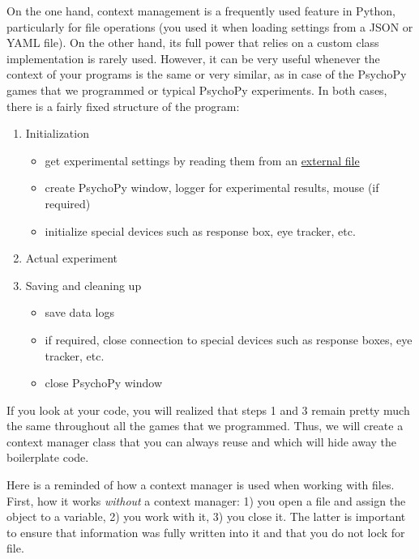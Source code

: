 \documentclass[
]{book}
\providecommand{\tightlist}{%
  \setlength{\itemsep}{0pt}\setlength{\parskip}{0pt}}
\begin{document}
On the one hand, context management is a frequently used feature in Python, particularly for file operations (you used it when loading settings from a JSON or YAML file). On the other hand, its full power that relies on a custom class implementation is rarely used. However, it can be very useful whenever the context of your programs is the same or very similar, as in case of the PsychoPy games that we programmed or typical PsychoPy experiments. In both cases, there is a fairly fixed structure of the program:

\begin{enumerate}
\def\labelenumi{\arabic{enumi}.}
\tightlist
\item
  Initialization

  \begin{itemize}
  \tightlist
  \item
    get experimental settings by reading them from an \protect\hyperlink{settings-files}{external file}
  \item
    create PsychoPy window, logger for experimental results, mouse (if required)
  \item
    initialize special devices such as response box, eye tracker, etc.
  \end{itemize}
\item
  Actual experiment
\item
  Saving and cleaning up

  \begin{itemize}
  \tightlist
  \item
    save data logs
  \item
    if required, close connection to special devices such as response boxes, eye tracker, etc.
  \item
    close PsychoPy window
  \end{itemize}
\end{enumerate}

If you look at your code, you will realized that steps 1 and 3 remain pretty much the same throughout all the games that we programmed. Thus, we will create a context manager class that you can always reuse and which will hide away the boilerplate code.

Here is a reminded of how a context manager is used when working with files. First, how it works \emph{without} a context manager: 1) you open a file and assign the object to a variable, 2) you work with it, 3) you close it. The latter is important to ensure that information was fully written into it and that you do not lock for file.
\end{document}
